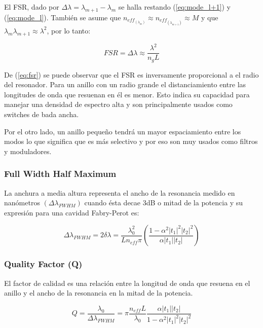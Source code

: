 El FSR, dado por $\Delta \lambda=\lambda_{m+1}-\lambda_m$ se halla restando
(\ref{eq:mode_l+1}) y (\ref{eq:mode_l}). También se 
asume que $n_{eff_{(\lambda_m)}} \approx n_{eff_{(\lambda_{m+1})}} \approx M $ 
y que $\lambda_m \lambda_{m+1} \approx \lambda^2 $, por lo tanto:

\begin{equation}
FSR=\Delta \lambda \approx \frac{\lambda^2}{n_g L}  
\label{eq:fsr}
\end{equation} 


De (\ref{eq:fsr}) se puede observar que el FSR es inversamente proporcional a el 
radio del resonador. Para un anillo con un radio grande el distanciamiento
entre las longitudes de onda que resuenan en él es menor. Esto indica su capacidad
para manejar una densidad de espectro alta y son principalmente usados como switches
de bada ancha. 

Por el otro lado, un anillo pequeño tendrá un mayor espaciamiento
entre los modos lo que significa que es más selectivo \cite{chan2011physical} y por
eso son muy usados como filtros y moduladores.

\subsubsection{Full Width Half Maximum}

La anchura a media altura representa el ancho de la resonancia
medido en nanómetros $(\Delta \lambda_{FWHM})$ cuando ésta 
decae 3dB o mitad de la potencia y su expresión
para una cavidad Fabry-Perot \cite{paloczi2005polymer}\cite{verdeyen1989laser} es:

\begin{equation}
\Delta \lambda_{FWHM}=2\delta \lambda
    =\frac{\lambda_0^2}{L n_{eff} \pi} 
     \left( \frac{1-\alpha^2|t_1|^2|t_2|^2}{\alpha |t_1||t_2|}  \right)
\label{eq:fwhm}
\end{equation} 

\subsubsection{Quality Factor (Q)}

El factor de calidad es una relación entre la longitud de onda que resuena en el 
anillo y el ancho de la resonancia en la mitad de la potencia.

\begin{equation}
Q = \frac{\lambda_0}{\Delta \lambda_{FWHM}} 
  = \pi \frac{n_{eff} L}{\lambda_0} \frac{\alpha|t_1||t_2|}{1-\alpha^2|t_1|^2|t_2|^2}
\label{eq:q}
\end{equation}

